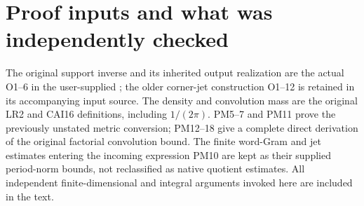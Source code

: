 \documentclass[11pt]{article}
\begin{document}
\section{Proof inputs and what was independently checked}
The original support inverse and its inherited output realization
are the actual O1--6 in the user-supplied
;
the older corner-jet construction O1--12 is retained in its
accompanying input source.  The density and convolution mass
are the original LR2 and CAI16 definitions, including $1/(2\pi)$.
PM5--7 and PM11 prove the previously unstated metric conversion;
PM12--18 give a complete direct derivation of the original
factorial convolution bound.  The finite word-Gram and jet
estimates entering the incoming expression PM10 are kept as
their supplied period-norm bounds, not reclassified as native
quotient estimates.  All independent finite-dimensional and
integral arguments invoked here are included in the text.
\end{document}
